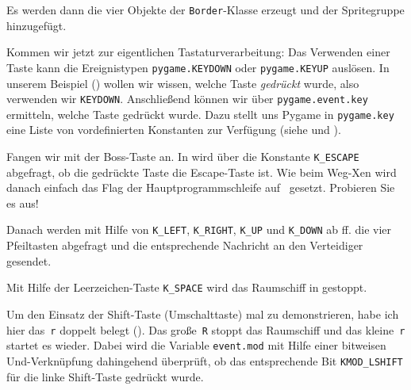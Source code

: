
Es werden dann die vier Objekte der \texttt{Border}-Klasse erzeugt und der Spritegruppe hinzugefügt.


Kommen wir jetzt zur eigentlichen Tastaturverarbeitung: Das Verwenden einer Taste kann die Ereignistypen \texttt{pygame.KEYDOWN} oder \texttt{pygame.KEYUP} auslösen. In unserem Beispiel () wollen wir wissen, welche Taste \emph{gedrückt} wurde, also verwenden wir \texttt{KEYDOWN}. Anschließend können wir über \texttt{pygame.event.key} ermitteln, welche Taste gedrückt wurde. Dazu stellt uns Pygame in \texttt{pygame.key} eine Liste von vordefinierten Konstanten zur Verfügung (siehe  und ).


Fangen wir mit der Boss-Taste an. In  wird über die Konstante \texttt{K\_ESCAPE} abgefragt, ob die gedrückte Taste die Escape-Taste ist. Wie beim Weg-Xen wird danach einfach das Flag der Hauptprogrammschleife auf \false\ gesetzt. Probieren Sie es aus!

Danach werden mit Hilfe von \texttt{K\_LEFT}, \texttt{K\_RIGHT}, \texttt{K\_UP} und \texttt{K\_DOWN} ab ff. die vier Pfeiltasten abgefragt und die entsprechende Nachricht an den Verteidiger gesendet.

Mit Hilfe der Leerzeichen-Taste \texttt{K\_SPACE} wird das Raumschiff in  gestoppt. 

Um den Einsatz der Shift-Taste (Umschalttaste) mal zu demonstrieren, habe ich hier das~\texttt{r} doppelt belegt (). Das große~\texttt{R} stoppt das Raumschiff und das kleine~\texttt{r} startet es wieder. Dabei wird die Variable \texttt{event.mod} mit Hilfe einer bitweisen Und-Verknüpfung dahingehend überprüft, ob das entsprechende Bit \texttt{KMOD\_LSHIFT} für die linke Shift-Taste gedrückt wurde.


